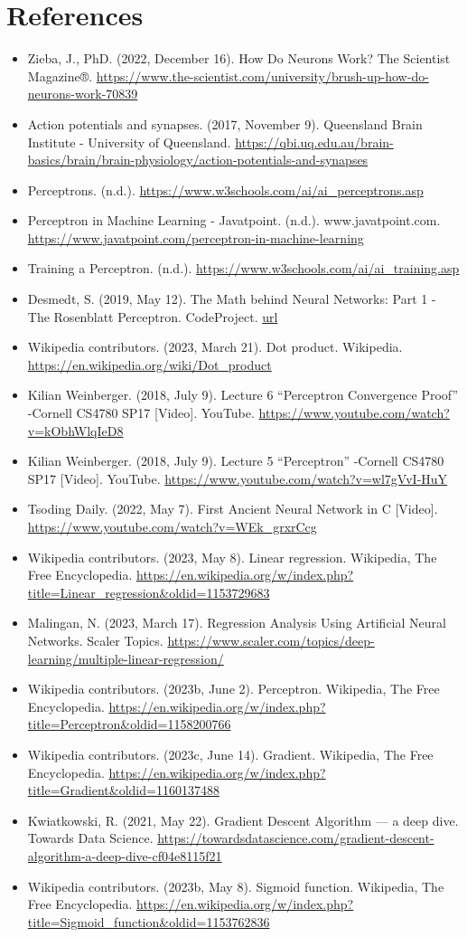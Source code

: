 \documentclass[12pt]{book}
\begin{document}
\chapter{References}
\begin{itemize}
\item Zieba, J., PhD. (2022, December 16). How Do Neurons Work? The Scientist Magazine®.
  \url{https://www.the-scientist.com/university/brush-up-how-do-neurons-work-70839}
\item Action potentials and synapses. (2017, November 9). Queensland Brain Institute - University
  of Queensland.
  \url{https://qbi.uq.edu.au/brain-basics/brain/brain-physiology/action-potentials-and-synapses}
\item Perceptrons. (n.d.). \url{https://www.w3schools.com/ai/ai_perceptrons.asp}
\item Perceptron in Machine Learning - Javatpoint. (n.d.). www.javatpoint.com.
  \url{https://www.javatpoint.com/perceptron-in-machine-learning}
\item Training a Perceptron. (n.d.). \url{https://www.w3schools.com/ai/ai_training.asp}
\item Desmedt, S. (2019, May 12). The Math behind Neural Networks: Part 1 - The Rosenblatt Perceptron.
  CodeProject.
  \href{https://www.codeproject.com/Articles/4047091/The-Math-behind-Neural-Networks-Part-1-The-Rosenbl}{
    url}
\item Wikipedia contributors. (2023, March 21). Dot product. Wikipedia.
  \url{https://en.wikipedia.org/wiki/Dot_product}
\item Kilian Weinberger. (2018, July 9). Lecture 6 “Perceptron Convergence Proof” -Cornell
  CS4780 SP17 [Video]. YouTube. \url{https://www.youtube.com/watch?v=kObhWlqIeD8}
\item Kilian Weinberger. (2018, July 9). Lecture 5 “Perceptron” -Cornell
  CS4780 SP17 [Video]. YouTube. \url{https://www.youtube.com/watch?v=wl7gVvI-HuY}
\item Tsoding Daily. (2022, May 7).
  First Ancient Neural Network in C [Video]. \url{https://www.youtube.com/watch?v=WEk_grxrCcg}
\item Wikipedia contributors. (2023, May 8). Linear regression. Wikipedia, The Free Encyclopedia.
  \url{https://en.wikipedia.org/w/index.php?title=Linear_regression&oldid=1153729683}
\item Malingan, N. (2023, March 17). Regression Analysis Using Artificial Neural Networks. Scaler Topics.
  \url{https://www.scaler.com/topics/deep-learning/multiple-linear-regression/}
\item Wikipedia contributors. (2023b, June 2). Perceptron. Wikipedia, The Free Encyclopedia.
  \url{https://en.wikipedia.org/w/index.php?title=Perceptron&oldid=1158200766}
\item Wikipedia contributors. (2023c, June 14). Gradient. Wikipedia, The Free Encyclopedia.
  \url{https://en.wikipedia.org/w/index.php?title=Gradient&oldid=1160137488}
\item Kwiatkowski, R. (2021, May 22). Gradient Descent Algorithm — a deep dive. Towards Data Science.
  \url{https://towardsdatascience.com/gradient-descent-algorithm-a-deep-dive-cf04e8115f21}

\item Wikipedia contributors. (2023b, May 8). Sigmoid function. Wikipedia, The Free Encyclopedia.
  \url{https://en.wikipedia.org/w/index.php?title=Sigmoid_function&oldid=1153762836}
\end{itemize}
\end{document}
